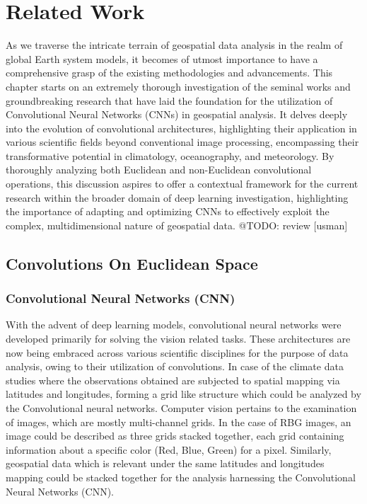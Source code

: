 
\clearpage
\cleardoublepage

\chapter{Related Work}
\label{chap:related_work}
As we traverse the intricate terrain of geospatial data analysis in the realm of global Earth system models,
it becomes of utmost importance to have a comprehensive grasp of the existing methodologies and advancements.
This chapter starts on an extremely thorough investigation of the seminal works and groundbreaking research that
have laid the foundation for the utilization of Convolutional Neural Networks (CNNs) in geospatial analysis.
It delves deeply into the evolution of convolutional architectures, highlighting their application in various scientific
fields beyond conventional image processing, encompassing their transformative potential in climatology, oceanography, and meteorology.
By thoroughly analyzing both Euclidean and non-Euclidean convolutional operations, this discussion aspires to offer a contextual framework
for the current research within the broader domain of deep learning investigation, highlighting the importance of adapting and optimizing CNNs
to effectively exploit the complex, multidimensional nature of geospatial data.
@TODO: review [usman]
\section{Convolutions On Euclidean Space}
\subsection{Convolutional Neural Networks (CNN)}
With the advent of deep learning models, convolutional neural networks were developed primarily for solving the vision related tasks. These architectures are now being embraced across various scientific disciplines for the purpose of data analysis, owing to their utilization of convolutions.
In case of the climate data studies where the observations obtained are subjected to spatial mapping via latitudes and longitudes, forming a grid like structure which could be analyzed by the Convolutional neural networks.
Computer vision pertains to the examination of images, which are mostly multi-channel grids. In the case of RBG images, an image could be described as three grids stacked together, each grid containing information about a specific color (Red, Blue, Green) for a pixel. Similarly, geospatial data which is relevant under the same latitudes and longitudes mapping could be stacked together for the analysis harnessing the Convolutional Neural Networks (CNN).

